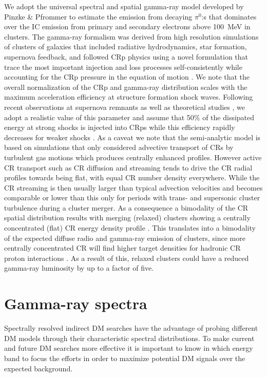 \documentclass[10pt,aps,pra,reprint,amsmath,amsfonts,amssymb,showpacs,nofootinbib,floatfix]{revtex4-1}
\begin{document}
We adopt the universal spectral and spatial gamma-ray model developed
by Pinzke \& Pfrommer \cite{2010MNRAS.409..449P} to estimate the
emission from decaying $\pi^0$:s that dominates over the IC emission
from primary and secondary electrons above 100~MeV in clusters. The
gamma-ray formalism was derived from high resolution simulations of
clusters of galaxies that included radiative hydrodynamics, star
formation, supernova feedback, and followed CRp physics using a novel
formulation that trace the most important injection and loss processes
self-consistently while accounting for the CRp pressure in the
equation of motion
\cite{2008A&A...481...33J,2007A&A...473...41E,2006MNRAS.367..113P}.
We note that the overall normalization of the CRp and gamma-ray
distribution scales with the maximum acceleration efficiency at
structure formation shock waves. Following recent observations at
supernova remnants \cite{2009Sci...325..719H} as well as theoretical
studies \cite{2005ApJ...620...44K}, we adopt a realistic value of this
parameter and assume that 50\% of the dissipated energy at strong
shocks is injected into CRps while this efficiency rapidly decreases
for weaker shocks \cite{2007A&A...473...41E}. As a caveat we note that
the semi-analytic model is based on simulations that only considered
advective transport of CRs by turbulent gas motions which produces
centrally enhanced profiles. However active CR transport such as CR
diffusion and streaming tends to drive the CR radial profiles towards
being flat, with equal CR number density everywhere. While the CR
streaming is then usually larger than typical advection velocities and
becomes comparable or lower than this only for periods with trans- and
supersonic cluster turbulence during a cluster merger. As a
consequence a bimodality of the CR spatial distribution results with
merging (relaxed) clusters showing a centrally concentrated (flat) CR
energy density profile \cite{2011A&A...527A..99E}.  This translates
into a bimodality of the expected diffuse radio and gamma-ray emission
of clusters, since more centrally concentrated CR will find higher
target densities for hadronic CR proton interactions
\cite{2011A&A...527A..99E}. As a result of this, relaxed clusters
could have a reduced gamma-ray luminosity by up to a factor of five.
 

\section{Gamma-ray spectra}
\label{sect:spectral}
Spectrally resolved indirect DM searches have the advantage of probing
different DM models through their characteristic spectral
distributions. To make current and future DM searches more effective
it is important to know in which energy band to focus the efforts in
order to maximize potential DM signals over the expected background.
\end{document}
